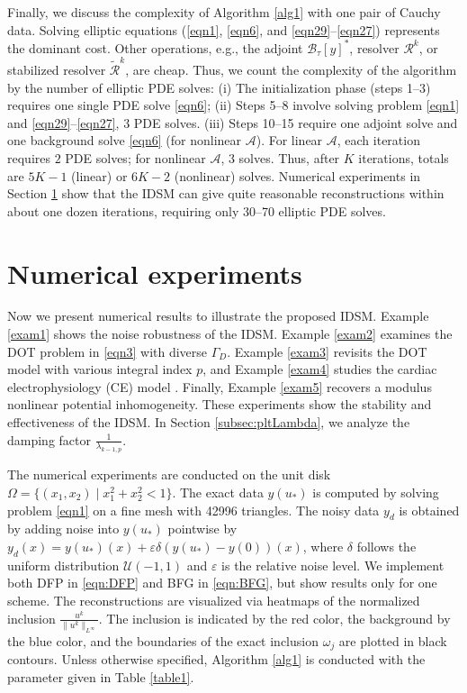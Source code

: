 \documentclass[onefignum,onetabnum]{siamart190516}
\numberwithin{equation}{section}
\begin{document}
Finally, we discuss the complexity of Algorithm \ref{alg1} with one pair of Cauchy data.
Solving elliptic equations (\eqref{eqn1}, \eqref{eqn6}, and \eqref{eqn29}–\eqref{eqn27}) represents the dominant cost.
Other operations, e.g., the adjoint $\mathcal{B}_{\tau}[y]^{*}$, resolver $\mathcal{R}^{k}$, or stabilized resolver $\widetilde{\mathcal{R}}^{k}$, are cheap.
Thus, we count the complexity of the algorithm by the number of elliptic PDE solves:
(i) The initialization phase (steps 1–3) requires one single PDE solve \eqref{eqn6};
(ii) Steps 5–8 involve solving problem \eqref{eqn1} and \eqref{eqn29}–\eqref{eqn27}, $3$ PDE solves.
(iii) Steps 10–15 require one adjoint solve and one background solve \eqref{eqn6} (for nonlinear $\mathcal{A}$).
For linear $\mathcal{A}$, each iteration requires $2$ PDE solves; for nonlinear $\mathcal{A}$, $3$ solves.
Thus, after $K$ iterations, totals are $5K-1$ (linear) or $6K-2$ (nonlinear) solves.
Numerical experiments in Section \ref{sec:NUM} {show that the IDSM can give quite reasonable reconstructions within about one dozen iterations, requiring only 30–70 elliptic PDE solves.}

\section{Numerical experiments} \label{sec:NUM}
\newcommand{\sevenfiglen}{0.11\textwidth}

Now we present numerical results to illustrate the proposed IDSM.
Example \ref{exam1} shows the noise robustness of the IDSM.
Example \ref{exam2} examines the DOT problem in \eqref{eqn3} with diverse $\Gamma_D$.
Example \ref{exam3} revisits the DOT model with various integral index $p$, and Example \ref{exam4} studies the cardiac electrophysiology (CE) model \cite{Scacchi2014}.
Finally, Example \ref{exam5} recovers a modulus nonlinear potential inhomogeneity.
These experiments show the stability and effectiveness of the IDSM.
In Section \ref{subsec:pltLambda}, we analyze the damping factor $\frac{1}{\lambda_{k-1,p}}$.

The numerical experiments are conducted on the unit disk $\Omega = \{(x_1, x_2) \mid x_1^2 + x_2^2 < 1\}$.
The exact data $y(u_*)$ is computed by solving problem \eqref{eqn1} on a fine mesh with 42996 triangles.
The noisy data $y_d$ is obtained by adding noise into $y(u_{*})$ pointwise by
$y_{d}(x) = y(u_{*})(x)+\varepsilon\delta\left(y(u_{*})-y(0)\right)(x)$,
where $\delta$ follows the uniform distribution $\mathcal{U}(-1,1)$ and $\varepsilon$ is the relative noise level.
We implement both DFP in \eqref{eqn:DFP} and BFG in \eqref{eqn:BFG}, but show results only for one scheme.
The reconstructions are visualized via heatmaps of the normalized inclusion $\frac{u^k}{\|u^k\|_{L^\infty}}$. The inclusion is indicated by the red color, the background by the blue color, and the boundaries of the exact inclusion $\omega_{j}$ are plotted in black contours.
Unless otherwise specified, Algorithm \ref{alg1} is conducted with the parameter given in Table \ref{table1}.
\end{document}
